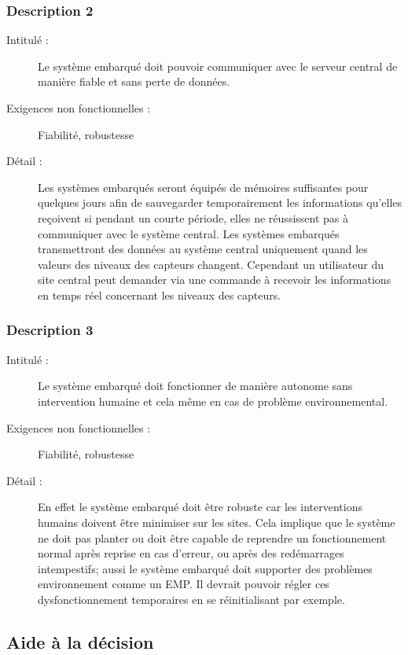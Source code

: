 \documentclass[11pt]{article}
\begin{document}
\subsubsection {Description 2}
\begin{description}
           \item[Intitulé :] Le système embarqué doit pouvoir communiquer avec le serveur central de manière fiable et sans perte de données.
           \item[Exigences non fonctionnelles :] Fiabilité, robustesse
           \item[Détail :] Les systèmes embarqués seront équipés de mémoires suffisantes pour quelques jours afin de sauvegarder temporairement les informations qu'elles reçoivent si pendant un courte période, elles ne réussissent pas à communiquer avec le système central. Les systèmes embarqués transmettront des données au système central uniquement quand les valeurs des niveaux des capteurs changent. Cependant un utilisateur du site central
peut demander via une commande à recevoir les informations en temps réel concernant les niveaux des capteurs.
\end{description}

\subsubsection {Description 3}
\begin{description}
           \item[Intitulé :] Le système embarqué doit fonctionner de manière autonome sans intervention humaine et cela même en cas de problème
environnemental.
           \item[Exigences non fonctionnelles :]Fiabilité, robustesse
           \item[Détail :] En effet le système embarqué doit être robuste car les interventions humains doivent être minimiser sur
les sites. Cela implique que le système ne doit pas planter ou doit être capable de reprendre un fonctionnement normal
après reprise en cas d'erreur, ou après des redémarrages intempestifs; aussi le système embarqué doit supporter des 
problèmes environnement comme un EMP. Il devrait pouvoir régler ces dysfonctionnement temporaires en se 
réinitialisant par exemple.
\end{description}


 \subsection {Aide à la décision}
\end{document}
